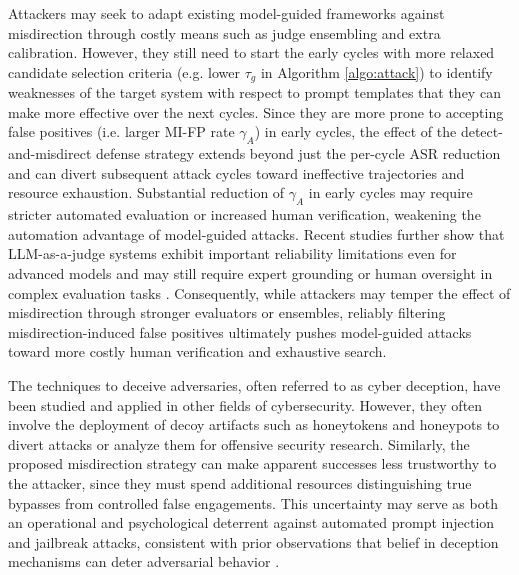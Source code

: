 \documentclass[conference,compsoc]{IEEEtran}
\begin{document}
Attackers may seek to adapt existing model-guided frameworks against misdirection through costly means such as judge ensembling and extra calibration.
However, they still need to start the early cycles with more relaxed candidate selection criteria (e.g. lower $\tau_g$ in Algorithm \ref{algo:attack}) to identify weaknesses of the target system with respect to prompt templates that they can make more effective over the next cycles.
Since they are more prone to accepting false positives (i.e. larger MI-FP rate $\gamma_A$) in early cycles, the effect of the detect-and-misdirect defense strategy extends beyond just the per-cycle ASR reduction and can divert subsequent attack cycles toward ineffective trajectories and resource exhaustion.
Substantial reduction of $\gamma_A$ in early cycles may require stricter automated evaluation or increased human verification, weakening the automation advantage of model-guided attacks.
Recent studies further show that LLM-as-a-judge systems exhibit important reliability limitations even for advanced models and may still require expert grounding or human oversight in complex evaluation tasks \cite{szymanski2025limitations, chen2024humans}.
Consequently, while attackers may temper the effect of misdirection through stronger evaluators or ensembles, reliably filtering misdirection-induced false positives ultimately pushes model-guided attacks toward more costly human verification and exhaustive search.

The techniques to deceive adversaries, often referred to as cyber deception, have been studied and applied in other fields of cybersecurity.
However, they often involve the deployment of decoy artifacts such as honeytokens and honeypots to divert attacks or analyze them for offensive security research.
Similarly, the proposed misdirection strategy can make apparent successes less trustworthy to the attacker, since they must spend additional resources distinguishing true bypasses from controlled false engagements.
This uncertainty may serve as both an operational and psychological deterrent against automated prompt injection and jailbreak attacks, consistent with prior observations that belief in deception mechanisms can deter adversarial behavior \cite{cydec-naval}.

\end{document}
